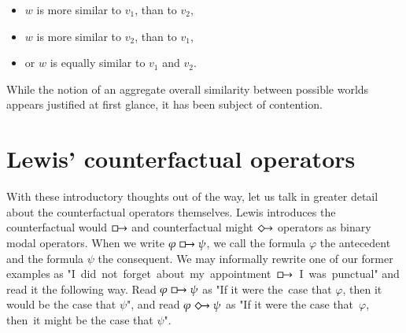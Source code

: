 \documentclass[a4paper,american,10pt]{paper}
\theoremstyle{definition}\newtheorem{definition}{Definition}
\begin{document}
\begin{itemize}
\item $w$ is more similar to $v_1$, than to $v_2$,
\item $w$ is more similar to $v_2$, than to $v_1$,
\item or $w$ is equally similar to $v_1$ and $v_2$.
\end{itemize}
While the notion of an aggregate overall similarity between possible worlds appears justified at first glance, it has been subject of contention. \cite{morreau_overall_similarity_2010}
\section{Lewis' counterfactual operators}
With these introductory thoughts out of the way, let us talk in greater detail about the counterfactual operators themselves. Lewis introduces the counterfactual would $\boxright$ and counterfactual might $\Diamondright$ operators as binary modal operators. \cite{lewis_counterfactuals_1973} When we write $\varphi\boxright\psi$, we call the formula $\varphi$ the antecedent and the formula $\psi$ the consequent. We may informally rewrite one of our former examples as "I~did~not~forget~about~my~appointment~$\boxright$~I~was~punctual" and read it the following way. Read $\varphi\boxright\psi$ as "If it were the~case that $\varphi$, then it would be the case that $\psi$", and read $\varphi\Diamondright\psi$ as "If it were the case that~$\varphi$, then~it might be the case that $\psi$".\\
\end{document}
